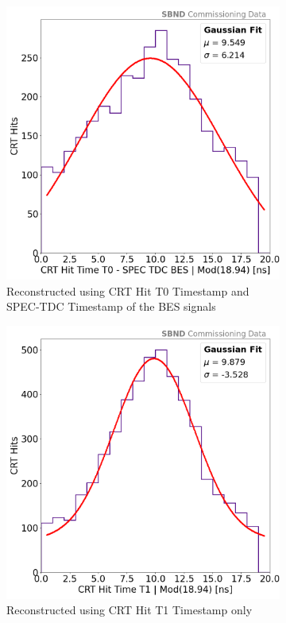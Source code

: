 \begin{figure}[htbp!]
\begin{subfigure}[h]{0.49\linewidth}
\centering    
\includegraphics[width=\linewidth]{CRTT0_SPEC_Bucket}
\caption{Reconstructed using CRT Hit T0 Timestamp and SPEC-TDC Timestamp of the BES signals}
\end{subfigure}
\hfill
\begin{subfigure}[h]{0.49\linewidth}
\centering    
\includegraphics[width=\linewidth]{CRT_T1_Bucket}
\caption{Reconstructed using CRT Hit T1 Timestamp only}
\end{subfigure}%
\caption{
}
\label{fig:beam_bucket}
\end{figure}

